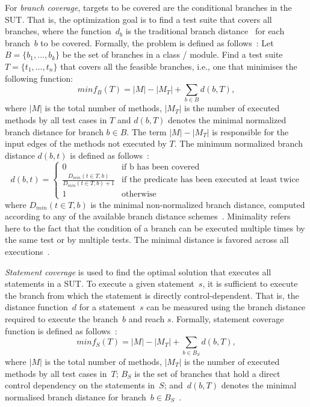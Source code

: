 \documentclass[paper=a4,%
  twoside,%
  BCOR4mm,%
  abstract=true,%
  toc=bibliography,%
  chapterprefix=true,%
  toc=bibliographynumbered,%
  open=right,%
  english,%
  pagesize=pdftex]{scrreprt}
\begin{document}
For \textit{branch coverage}, targets to be covered are the conditional branches in the \ac{SUT}. That is, the optimization goal is to find a test suite that covers all branches, where the function~$d_b$ is the traditional branch distance~\cite{Pacheco_2007} for each branch~$b$ to be covered. Formally, the problem is defined as follows~\cite{Fraser2014}: Let $B = \{b_1, \dots, b_k\}$ be the set of branches in a class / module. Find a test suite $T = \{t_1, \dots, t_n\}$ that covers all the feasible branches, i.e., one that minimises the following function:
\begin{equation}
minf_B(T) = \left|M\right| - \left|M_T\right| + \sum_{b \in B}{d(b, T)},
\end{equation}
where $\left|M\right|$ is the total number of methods, $\left|M_T\right|$ is the number of executed methods by all test cases in $T$ and $d(b, T)$ denotes the minimal normalized branch distance for branch $b \in B$. The term $\left|M\right| - \left|M_T\right|$ is responsible for the input edges of the methods not executed by $T$. The minimum normalized branch distance $d(b, t)$ is defined as follows~\cite{Fraser_2013}:
\begin{equation}
d(b, t) = \left\{ \begin{array}{cl}
0 & \textrm{if b has been covered} \\
\frac{D_{min}(t \in T, b)}{D_{min}(t \in T, b) + 1} & \textrm{if the predicate has been executed at least twice} \\
1 & \textrm{otherwise}
\end{array} \right.
\end{equation}
where $D_{min}(t \in T, b)$ is the minimal non-normalized branch distance, computed according to any of the available branch distance schemes~\cite{McMinn_2004}. Minimality refers here to the fact that the condition of a branch can be executed multiple times by the same test or by multiple tests. The minimal distance is favored across all executions~\cite{Panichella2018}.

\textit{Statement coverage} is used to find the optimal solution that executes all statements in a \ac{SUT}. To execute a given statement~$s$, it is sufficient to execute the branch from which the statement is directly control-dependent. That is, the distance function~$d$ for a statement~$s$ can be measured using the branch distance required to execute the branch~$b$ and reach $s$. Formally, statement coverage function is defined as follows~\cite{Fraser_2013}:
\begin{equation}
minf_S(T) = \left|M\right| - \left|M_T\right| + \sum_{b \in B_S}{d(b, T)},
\end{equation}
where $\left|M\right|$ is the total number of methods, $\left|M_T\right|$ is the number of executed methods by all test cases in~$T$; $B_S$ is the set of branches that hold a direct control dependency on the statements in~$S$; and~$d(b, T)$ denotes the minimal normalised branch distance for branch~$b \in B_S$~\cite{Panichella2018}.
\end{document}
